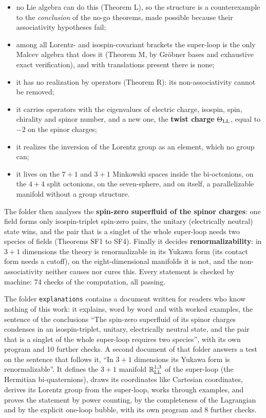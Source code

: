\documentclass[
  10pt,
]{article}
\providecommand{\tightlist}{%
  \setlength{\itemsep}{0pt}\setlength{\parskip}{0pt}}
\begin{document}
\begin{itemize}
\tightlist
\item
  no Lie algebra can do this (Theorem L), so the structure is a
  counterexample to the \emph{conclusion} of the no-go theorems, made
  possible because their associativity hypotheses fail;
\item
  among all Lorentz- and isospin-covariant brackets the super-loop is
  the only Malcev algebra that does it (Theorem M, by Gröbner bases and
  exhaustive exact verification), and with translations present there is
  none;
\item
  it has no realization by operators (Theorem R): its non-associativity
  cannot be removed;
\item
  it carries operators with the eigenvalues of electric charge, isospin,
  spin, chirality and spinor number, and a new one, the \textbf{twist
  charge} \(\Theta_{\rm LL}\), equal to \(-2\) on the spinor charges;
\item
  it realizes the inversion of the Lorentz group as an element, which no
  group can;
\item
  it lives on the \(7+1\) and \(3+1\) Minkowski spaces inside the
  bi-octonions, on the \(4+4\) split octonions, on the seven-sphere, and
  on itself, a parallelizable manifold without a group structure.
\end{itemize}

The folder then analyses the \textbf{spin-zero superfluid of the spinor
charges}: one field forms only isospin-triplet spin-zero pairs, the
unitary (electrically neutral) state wins, and the pair that is a
singlet of the whole super-loop needs two species of fields (Theorems
SF1 to SF4). Finally it decides \textbf{renormalizability}: in \(3+1\)
dimensions the theory is renormalizable in its Yukawa form (its contact
form needs a cutoff), on the eight-dimensional manifolds it is not, and
the non-associativity neither causes nor cures this. Every statement is
checked by machine: 74 checks of the computation, all passing.

The folder \texttt{explanations} contains a document written for readers
who know nothing of this work: it explains, word by word and with worked
examples, the sentence of the conclusions ``The spin-zero superfluid of
its spinor charges condenses in an isospin-triplet, unitary,
electrically neutral state, and the pair that is a singlet of the whole
super-loop requires two species'', with its own program and 10 further
checks. A second document of that folder answers a test on the sentence
that follows it, ``In \(3+1\) dimensions its Yukawa form is
renormalizable''. It defines the \(3+1\) manifold
\(\mathbb R^{1,3}_{\rm LL}\) of the super-loop (the Hermitian
bi-quaternions), draws its coordinates like Cartesian coordinates,
derives its Lorentz group from the super-loop, works through examples,
and proves the statement by power counting, by the completeness of the
Lagrangian and by the explicit one-loop bubble, with its own program and
8 further checks.
\end{document}

